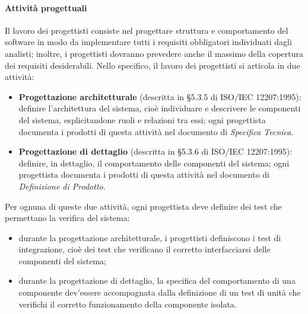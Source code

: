 	\paragraph{Attività progettuali} Il lavoro dei progettisti consiste nel progettare
struttura e comportamento del software in modo da implementare tutti i requisiti
obbligatori individuati dagli analisti; inoltre, i progettisti dovranno prevedere
anche il massimo della copertura dei requisiti desiderabili. Nello specifico, il lavoro dei progettisti si articola in due
attività:
\begin{itemize}
\item \textbf{Progettazione architetturale} (descritta in §5.3.5 di ISO/IEC 12207:1995): definire l’architettura del sistema, cioè individuare e descrivere le componenti
del sistema, esplicitandone ruoli e relazioni tra essi; ogni progettista
documenta i prodotti di questa attività nel documento di \emph{Specifica Tecnica}.
\item \textbf{Progettazione di dettaglio} (descritta in §5.3.6 di ISO/IEC 12207:1995): definire, in dettaglio, il comportamento delle componenti del sistema;
ogni progettista documenta i prodotti di questa attività nel documento di
\emph{Definizione di Prodotto}.
\end{itemize}
Per ognuna di queste due attività, ogni progettista deve definire dei test che
permettano la verifica del sistema:
\begin{itemize}
\item durante la progettazione architetturale, i progettisti definiscono i test di
integrazione, cioè dei test che verificano il corretto interfacciarsi delle
componenti del sistema;
\item durante la progettazione di dettaglio, la specifica del comportamento di
una componente dev’essere accompagnata dalla definizione di un test di
unità che verifichi il corretto funzionamento della componente isolata.

\end{itemize}
